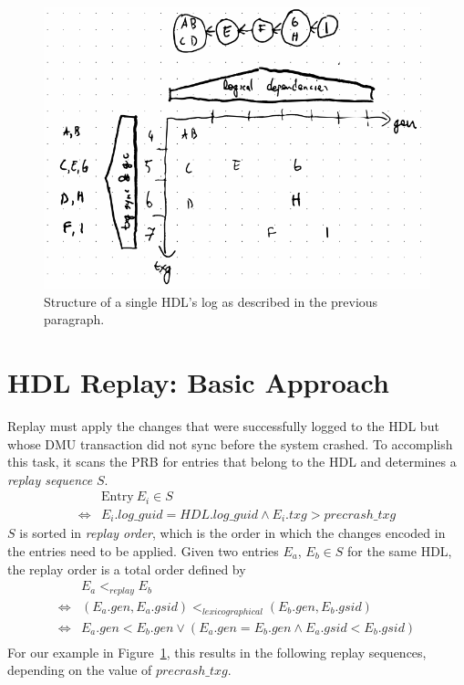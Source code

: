 \documentclass[12pt,a4paper,twoside]{book}
\begin{document}
\begin{figure}[H]
    \includegraphics{fig/prb_hdl_log_structure_example}
    \caption{Structure of a single HDL's log as described in the previous paragraph.}
    \label{fig:prb_hdl_log_structure_example}
\end{figure}

\section{HDL Replay: Basic Approach}\label{di:prb:replayapproach}
Replay must apply the changes that were successfully logged to the HDL but whose DMU transaction did not sync before the system crashed.
To accomplish this task, it scans the PRB for entries that belong to the HDL and determines a \textit{replay sequence} $S$.
\begin{align*}
    & \text{Entry}~E_i \in S \\
    \Leftrightarrow & E_i.log\_guid = HDL.log\_guid \wedge E_i.txg > precrash\_txg
\end{align*}
$S$ is sorted in \textit{replay order}, which is the order in which the changes encoded in the entries need to be applied.
Given two entries $E_a$, $E_b \in S$ for the same HDL, the replay order is a total order defined by
\begin{align*}
    & E_a <_{replay} E_b \\
    \Leftrightarrow &  (E_a.gen, E_a.gsid) <_{lexicographical} (E_b.gen, E_b.gsid) \\
    \Leftrightarrow & E_a.gen < E_b.gen \vee (E_a.gen = E_b.gen \wedge E_a.gsid < E_b.gsid) \\
\end{align*}
For our example in Figure~\ref{fig:prb_hdl_log_structure_example}, this results in the following replay sequences, depending on the value of $precrash\_txg$.
\end{document}
